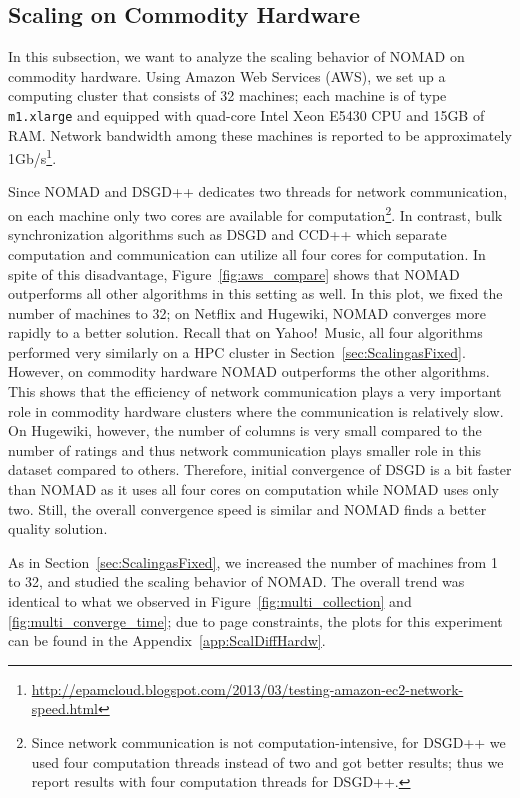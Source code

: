 \documentclass{vldb}
\begin{document}
\subsection{Scaling on Commodity Hardware}
\label{sec:ScalDiffHardw}



In this subsection, we want to analyze the scaling behavior of NOMAD
on commodity hardware.  Using Amazon Web Services (AWS), we set up a
computing cluster that consists of 32 machines; each machine is of
type \texttt{m1.xlarge} and equipped with quad-core Intel Xeon E5430
CPU and 15GB of RAM.  Network bandwidth among these machines is
reported to be approximately
1Gb/s\footnote{\url{http://epamcloud.blogspot.com/2013/03/testing-amazon-ec2-network-speed.html}}.

Since NOMAD and DSGD++ dedicates two threads for network
communication, on each machine only two cores are available for
computation\footnote{Since network communication is not
  computation-intensive, for DSGD++ we used four computation threads
  instead of two and got better results; thus we report results with
  four computation threads for DSGD++. }. In contrast, bulk
synchronization algorithms such as DSGD and CCD++ which separate
computation and communication can utilize all four cores for
computation.
In spite of this disadvantage, Figure~\ref{fig:aws_compare} shows that
NOMAD outperforms all other algorithms in this setting as well.  In this
plot, we fixed the number of machines to 32; on Netflix and Hugewiki,
NOMAD converges more rapidly to a better solution.  Recall that on
Yahoo!~Music, all four algorithms performed very similarly on a HPC
cluster in Section~\ref{sec:ScalingasFixed}.  However, on commodity
hardware NOMAD outperforms the other algorithms.  This shows that the
efficiency of network communication plays a very important role in
commodity hardware clusters where the communication is relatively slow.
On Hugewiki, however, the number of columns is very small
compared to the number of ratings and thus network communication plays
smaller role in this dataset compared to others.  Therefore, initial
convergence of DSGD is a bit faster than NOMAD as it uses all four cores
on computation while NOMAD uses only two.  Still, the overall
convergence speed is similar and NOMAD finds a better quality solution.

As in Section~\ref{sec:ScalingasFixed}, we increased the number of
machines from 1 to 32, and studied the scaling behavior of NOMAD.  The
overall trend was identical to what we observed in
Figure~\ref{fig:multi_collection} and \ref{fig:multi_converge_time};
due to page constraints, the plots for this experiment can be found in
the Appendix~\ref{app:ScalDiffHardw}.
\end{document}

